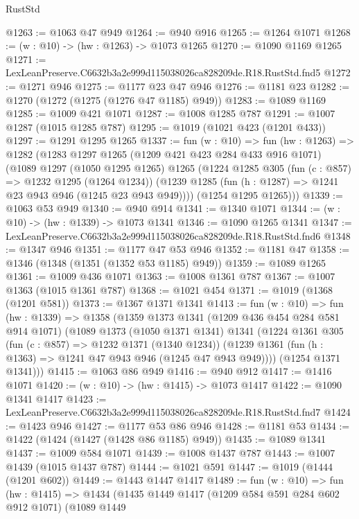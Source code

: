 \begin{lexlean}{RustStd}
\begin{coremodule}
@1263 := @1063 @47 @949
@1264 := @940 @916
@1265 := @1264 @1071
@1268 := (w : @10) -> (hw : @1263) -> @1073 @1265
@1270 := @1090 @1169 @1265
@1271 := LexLeanPreserve.C6632b3a2e999d115038026ca828209de.R18.RustStd.fnd5
@1272 := @1271 @946
@1275 := @1177 @23 @47 @946
@1276 := @1181 @23
@1282 := @1270 (@1272 (@1275 (@1276 @47 @1185) @949))
@1283 := @1089 @1169
@1285 := @1009 @421 @1071
@1287 := @1008 @1285 @787
@1291 := @1007 @1287 (@1015 @1285 @787)
@1295 := @1019 (@1021 @423 (@1201 @433))
@1297 := @1291 @1295 @1265
@1337 := fun (w : @10) =>
  fun (hw : @1263) =>
  @1282
    (@1283
      @1297
      @1265
      (@1209 @421 @423 @284 @433 @916 @1071)
      (@1089
        @1297
        (@1050 @1295 @1265)
        @1265
        (@1224
          @1285
          @305
          (fun (c : @857) => @1232 @1295 (@1264 @1234))
          (@1239 @1285 (fun (h : @1287) => @1241 @23 @943 @946 (@1245 @23 @943 @949))))
        (@1254 @1295 @1265)))
@1339 := @1063 @53 @949
@1340 := @940 @914
@1341 := @1340 @1071
@1344 := (w : @10) -> (hw : @1339) -> @1073 @1341
@1346 := @1090 @1265 @1341
@1347 := LexLeanPreserve.C6632b3a2e999d115038026ca828209de.R18.RustStd.fnd6
@1348 := @1347 @946
@1351 := @1177 @47 @53 @946
@1352 := @1181 @47
@1358 := @1346 (@1348 (@1351 (@1352 @53 @1185) @949))
@1359 := @1089 @1265
@1361 := @1009 @436 @1071
@1363 := @1008 @1361 @787
@1367 := @1007 @1363 (@1015 @1361 @787)
@1368 := @1021 @454
@1371 := @1019 (@1368 (@1201 @581))
@1373 := @1367 @1371 @1341
@1413 := fun (w : @10) =>
  fun (hw : @1339) =>
  @1358
    (@1359
      @1373
      @1341
      (@1209 @436 @454 @284 @581 @914 @1071)
      (@1089
        @1373
        (@1050 @1371 @1341)
        @1341
        (@1224
          @1361
          @305
          (fun (c : @857) => @1232 @1371 (@1340 @1234))
          (@1239 @1361 (fun (h : @1363) => @1241 @47 @943 @946 (@1245 @47 @943 @949))))
        (@1254 @1371 @1341)))
@1415 := @1063 @86 @949
@1416 := @940 @912
@1417 := @1416 @1071
@1420 := (w : @10) -> (hw : @1415) -> @1073 @1417
@1422 := @1090 @1341 @1417
@1423 := LexLeanPreserve.C6632b3a2e999d115038026ca828209de.R18.RustStd.fnd7
@1424 := @1423 @946
@1427 := @1177 @53 @86 @946
@1428 := @1181 @53
@1434 := @1422 (@1424 (@1427 (@1428 @86 @1185) @949))
@1435 := @1089 @1341
@1437 := @1009 @584 @1071
@1439 := @1008 @1437 @787
@1443 := @1007 @1439 (@1015 @1437 @787)
@1444 := @1021 @591
@1447 := @1019 (@1444 (@1201 @602))
@1449 := @1443 @1447 @1417
@1489 := fun (w : @10) =>
  fun (hw : @1415) =>
  @1434
    (@1435
      @1449
      @1417
      (@1209 @584 @591 @284 @602 @912 @1071)
      (@1089
        @1449

\end{coremodule}
\end{lexlean}
